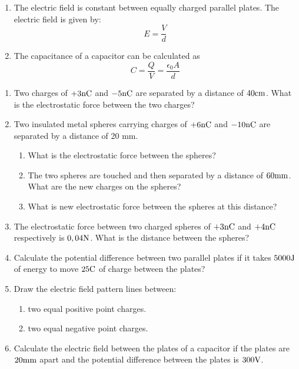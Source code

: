 \begin{enumerate}
\item The electric field is constant between equally charged parallel
plates. The electric field is given by:
\begin{equation*}
E = \frac{V}{d}
\end{equation*}

\item The capacitance of a capacitor can be calculated as
\begin{equation*}
C = \frac{Q}{V} = \frac{\epsilon _{0}A}{d}
\end{equation*}
\end{enumerate}

\begin{eocexercises}{}
\begin{enumerate}

\item Two charges of $+3{\rm nC}$ and $-5{\rm nC}$ are separated by a distance of $40 {\rm cm}$. What is the electrostatic force between the two charges?
\item {Two insulated metal spheres carrying charges of  $+6{\rm nC}$ and $-10{\rm nC}$ are separated by a distance of 20 mm.
\begin {enumerate}
\item {What is the electrostatic force between the spheres?}
\item {The two spheres are touched and then separated by a distance of $60 {\rm mm}$. What are the new charges on the spheres?}
\item {What is new electrostatic force between the spheres at this distance?}
\end {enumerate}}
\item The electrostatic force between two charged spheres of $+3{\rm nC}$ and $+4{\rm nC}$ respectively is $0,04 {\rm N}$. What is the distance between the spheres?
\item Calculate the potential difference between two parallel plates if it takes $5000 {\rm J}$ of energy to move $25 {\rm C}$ of charge between the plates?
\item {Draw the electric field pattern lines between:
\begin {enumerate}
\item {two equal positive point charges.}
\item {two equal negative point charges.}
\end {enumerate}}
\item Calculate the electric field between the plates of a capacitor if the plates are $20 {\rm mm}$ apart and the potential difference between the plates is $300 {\rm V}$.

\end{enumerate}
\end{eocexercises}
